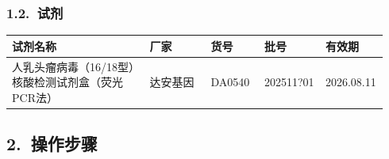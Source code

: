 \documentclass[UTF8,10pt,a4paper,fontset=fandol]{ctexart}
\newcommand{\fieldvalue}[1]{#1}
\newcommand{\handwritten}[1]{#1}
\begin{document}
\subsubsection*{1.2.\ 试剂}

\begin{center}
\begin{tabular}{|p{0.36\linewidth}|p{0.16\linewidth}|p{0.14\linewidth}|p{0.16\linewidth}|p{0.12\linewidth}|}
\hline
试剂名称 & 厂家 & 货号 & 批号 & 有效期 \\
\hline
\fieldvalue{人乳头瘤病毒（16/18型）核酸检测试剂盒（荧光PCR法）} &
\fieldvalue{达安基因} &
\fieldvalue{DA0540} &
\fieldvalue{\handwritten{202511?01}} &
\fieldvalue{\handwritten{2026.08.11}} \\
\hline
\end{tabular}
\end{center}

\subsection*{2.\ 操作步骤}
\end{document}
